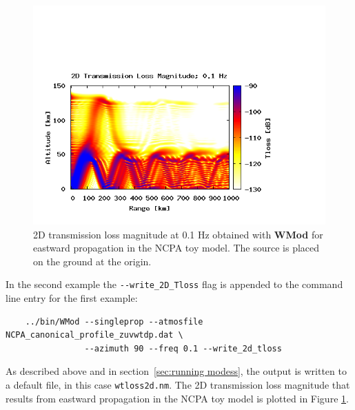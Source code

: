 \begin{figure}
\begin{center}
\includegraphics[scale=0.45,trim = 20 20 110 140,clip]{figs/wmod_ex2}
\end{center}
\caption{2D transmission loss magnitude at 0.1 Hz obtained with {\bf WMod} for eastward propagation in the NCPA toy model. The source is placed on the ground at the origin.}
\label{fig: wmod 2D tl}
\end{figure}

\newpage

In the second example the \verb+--write_2D_Tloss+ flag is appended to the command line entry for the first example: 
\begin{verbatim} 
    ../bin/WMod --singleprop --atmosfile NCPA_canonical_profile_zuvwtdp.dat \ 
                --azimuth 90 --freq 0.1 --write_2d_tloss
\end{verbatim}
As described above and in section~\ref{sec:running modess}, the output is written to a default file, in this case \verb+wtloss2d.nm+. The 2D transmission loss magnitude that results from eastward propagation in the NCPA toy model is plotted in Figure \ref{fig: wmod 2D tl}. 

